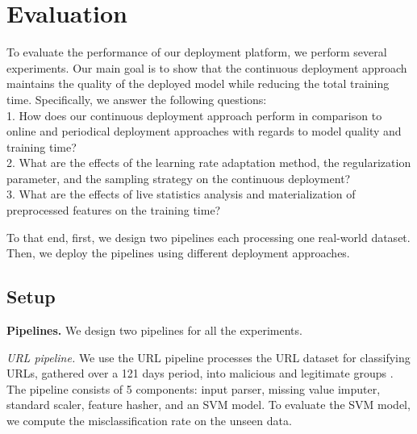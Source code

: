 \section{Evaluation} \label{evaluation} 
To evaluate the performance of our deployment platform, we perform several experiments.
Our main goal is to show that the continuous deployment approach maintains the quality of the deployed model while reducing the total training time.
Specifically, we answer the following questions:\\
1. How does our continuous deployment approach perform in comparison to online and periodical deployment approaches with regards to model quality and training time? \\
2. What are the effects of the learning rate adaptation method, the regularization parameter, and the sampling strategy on the continuous deployment? \\
3. What are the effects of live statistics analysis and materialization of preprocessed features on the training time?

To that end, first, we design two pipelines each processing one real-world dataset.
Then, we deploy the pipelines using different deployment approaches.

\subsection{Setup}\label{subsec:setup}
\textbf{Pipelines.}
We design two pipelines for all the experiments.

\textit{URL pipeline.} We use the URL pipeline processes the URL dataset for classifying URLs, gathered over a 121 days period, into malicious and legitimate groups \cite{ma2009identifying}.
The pipeline consists of 5 components: input parser, missing value imputer, standard scaler, feature hasher, and an SVM model.
To evaluate the SVM model, we compute the misclassification rate on the unseen data.

